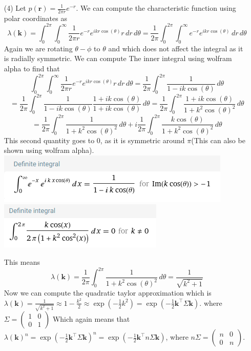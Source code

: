 \documentclass[12pt]{amsart}
\theoremstyle{definition}
\begin{document}
\begin{itemize}
\item[(4)] Let $p(\textbf{r})=\frac{1}{2\pi r}e^{-r}$. We can compute the characteristic function using polar coordinates as
$$\lambda(\textbf{k})=\int_{0}^{2\pi}\int_{0}^{\infty} \frac{1}{2\pi r}e^{-r}e^{ikr\cos(\theta)}r\,dr\,d\theta=\frac{1}{2\pi }\int_{0}^{2\pi}\int_{0}^{\infty} e^{-r}e^{ikr\cos(\theta)}\,dr\,d\theta$$
Again we are rotating $\theta-\phi$ to $\theta$ and which does not affect the integral as it is radially symmetric. We can compute The inner integral using wolfram alpha to find that
$$\int_{0}^{2\pi}\int_{0}^{\infty} \frac{1}{2\pi r}e^{-r}e^{ikr\cos(\theta)}r\,dr\,d\theta=\frac{1}{2\pi}\int_{0}^{2\pi} \frac{1}{1-ik\cos(\theta)}\,d\theta$$
$$=\frac{1}{2\pi}\int_{0}^{2\pi} \frac{1}{1-ik\cos(\theta)}\frac{1+ik\cos(\theta)}{1+ik\cos(\theta)}\,d\theta=\frac{1}{2\pi}\int_{0}^{2\pi} \frac{1+ik\cos(\theta)}{1+k^2\cos(\theta)^2}\,d\theta$$
$$=\frac{1}{2\pi}\int_{0}^{2\pi} \frac{1}{1+k^2\cos(\theta)^2}\,d\theta+i\frac{1}{2\pi}\int_{0}^{2\pi} \frac{k\cos(\theta)}{1+k^2\cos(\theta)^2}\,d\theta$$
This second quantity goes to $0$, as it is symmetric around $\pi$(This can also be shown using wolfram alpha).\\
\includegraphics[scale=.5]{rw-p4-int1.png}
\includegraphics[scale=.5]{rw-p4-int2.png}

This means 
$$\lambda(\textbf{k})=\frac{1}{2\pi}\int_{0}^{2\pi} \frac{1}{1+k^2\cos(\theta)^2}\,d\theta=\frac{1}{\sqrt{k^2+1}}$$
Now we can compute the quadratic taylor approximation which is $\lambda(\textbf{k})=\frac{1}{\sqrt{k^2+1}}\approx 1-\frac{k^2}{2}\approx\exp(-\frac{1}{2}k^2)=\exp(-\frac{1}{2}\textbf{k}^\intercal\Sigma\textbf{k})$. where $\Sigma=\begin{pmatrix} 1 & 0\\ 0 & 1 \end{pmatrix}$
Which again means that $\lambda(\textbf{k})^n=\exp(-\frac{1}{2}\textbf{k}^\intercal\Sigma\textbf{k})^n=\exp(-\frac{1}{2}\textbf{k}^\intercal n\Sigma\textbf{k})$, where $n\Sigma=\begin{pmatrix} n & 0\\ 0 & n \end{pmatrix}$.\\


\end{itemize}
\end{document}

